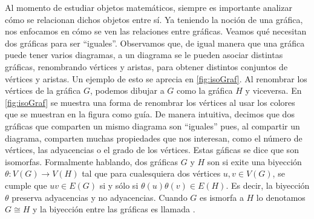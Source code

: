 Al momento de estudiar objetos matem\'aticos, siempre es importante analizar
c\'omo se relacionan dichos objetos entre s\'i. Ya teniendo la noci\'on de una
gr\'afica, nos enfocamos en c\'omo se ven las relaciones entre gr\'aficas.
Veamos qu\'e necesitan dos gr\'aficas para ser ``iguales''. Observamos que, de
igual manera que una gr\'afica puede tener varios diagramas, a un diagrama se le
pueden asociar distintas gr\'aficas, renombrando v\'ertices y aristas, para
obtener distintos conjuntos de v\'ertices y aristas. Un ejemplo de esto se
aprecia en \cref{fig:isoGraf}. Al renombrar los v\'ertices de la gr\'afica $G$,
podemos dibujar a $G$ como la gr\'afica $H$ y viceversa. En \cref{fig:isoGraf}
se muestra una forma de renombrar los v\'ertices al usar los colores que se
muestran en la figura como gu\'ia. De manera intuitiva, decimos que dos
gr\'aficas que comparten un mismo diagrama son ``iguales'' pues, al compartir un
diagrama, comparten muchas propiedades que nos interesan, como el n\'umero de
v\'ertices, las adyacencias o el grado de los v\'ertices. Estas g\'aficas se
dice que son isomorfas. Formalmente hablando, dos gr\'aficas $G$ y $H$ son
 si exite una biyecci\'on $\theta: V(G)
\rightarrow V(H)$ tal que para cualesquiera dos v\'ertices $u, v \in V(G)$, se
cumple que $uv \in E(G)$ si y s\'olo si $\theta(u)\theta(v) \in E(H)$. Es decir,
la biyecci\'on $\theta$ preserva adyacencias y no adyacencias. Cuando $G$ es
ismorfa a $H$ lo denotamos $G \cong H$ y la biyecci\'on entre las gr\'aficas es
llamada .


